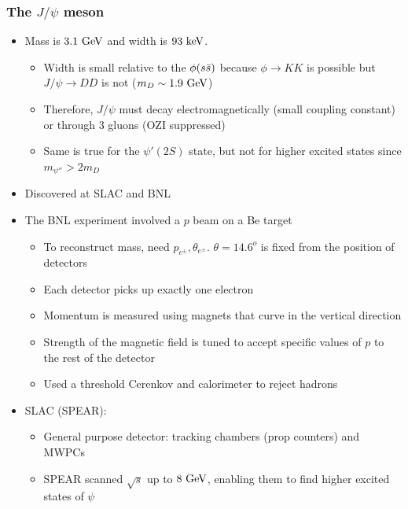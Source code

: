 \subsubsection{The $J/\psi$ meson}
\begin{itemize}
  \item Mass is $3.1~\text{GeV}$ and width is $93~\text{keV}$. 
  \begin{itemize}
    \item Width is small relative to the $\phi(s\bar{s})$ because $\phi \rightarrow KK$ is possible but $J/\psi \rightarrow DD$ is not ($m_D \sim 1.9~\text{GeV}$)
    \item Therefore, $J/\psi$ must decay electromagnetically (small coupling constant) or through 3 gluons (OZI suppressed)
    \item Same is true for the $\psi'(2S)$  state, but not for higher excited states since $m_{\psi''} > 2m_D$
  \end{itemize}
  \item Discovered at SLAC and BNL
  \item The BNL experiment involved a $p$ beam on a Be target
  \begin{itemize}
    \item To reconstruct mass, need $p_{e^\pm},\theta_{e^\pm}$. $\theta = 14.6^o$ is fixed from the position of detectors
    \item Each detector picks up exactly one electron
    \item Momentum is measured using magnets that curve in the vertical direction
    \item Strength of the magnetic field is tuned to accept specific values of $p$ to the rest of the detector
    \item Used a threshold Cerenkov and calorimeter to reject hadrons
  \end{itemize}
  \item SLAC (SPEAR):
  \begin{itemize}
    \item General purpose detector: tracking chambers (prop counters) and MWPCs
    \item SPEAR scanned $\sqrt s$ up to $8~\text{GeV}$, enabling them to find higher excited states of $\psi$
  \end{itemize}
\end{itemize}

